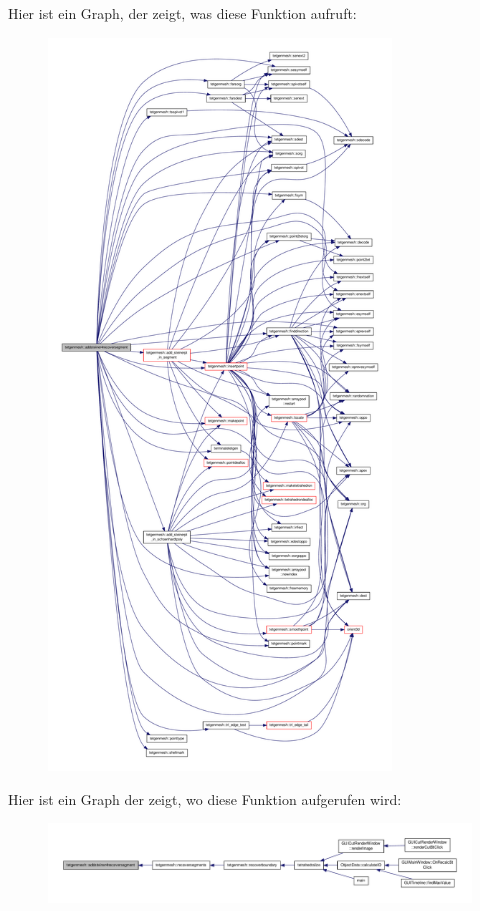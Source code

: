 Hier ist ein Graph, der zeigt, was diese Funktion aufruft\-:\nopagebreak
\begin{figure}[H]
\begin{center}
\leavevmode
\includegraphics[height=550pt]{classtetgenmesh_a9d878a0e64588b0471a58e534affea8e_cgraph}
\end{center}
\end{figure}




Hier ist ein Graph der zeigt, wo diese Funktion aufgerufen wird\-:\nopagebreak
\begin{figure}[H]
\begin{center}
\leavevmode
\includegraphics[width=350pt]{classtetgenmesh_a9d878a0e64588b0471a58e534affea8e_icgraph}
\end{center}
\end{figure}


